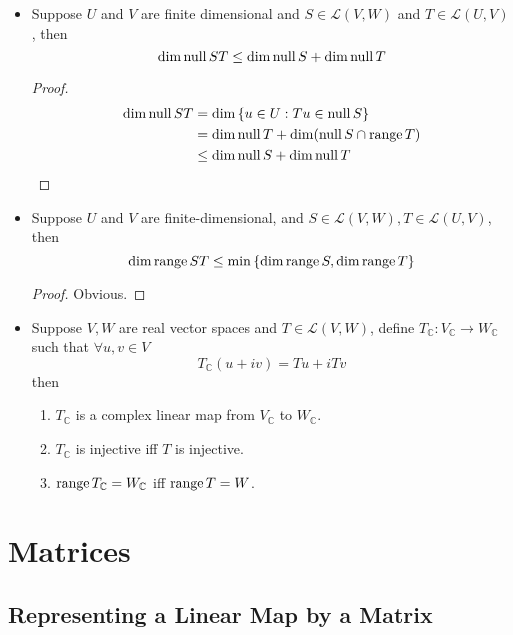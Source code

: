 \documentclass[../main.tex]{subfiles}
\begin{document}
\begin{itemize}
\item Suppose $U$ and $V$ are finite dimensional and $S\in \mathscr{L}(V,W)$ and $T\in \mathscr{L}(U,V)$, then 
	\begin{equation}
	\dim \operatorname{null} ST \leq \dim\operatorname{null} S + \dim \operatorname{null} T
	\end{equation}
	\begin{proof}
	\begin{equation*}
	\begin{aligned}
		\dim \operatorname{null} ST &= \dim \left\{ u \in U: Tu \in \operatorname{null} S \right\} \\
			       &= \dim \operatorname{null} T + \dim (\operatorname{null} S \cap \operatorname{range} T)\\
			       &\leq \dim\operatorname{null} S + \dim\operatorname{null} T
	\end{aligned}
	\end{equation*}
	\end{proof}
\item Suppose $U$ and $V$ are finite-dimensional, and $S\in \mathscr{L}(V,W), T\in \mathscr{L}(U,V)$, then
	\begin{equation}
	\dim\operatorname{range} ST \leq \min \left\{ \dim\operatorname{range} S, \dim\operatorname{range} T \right\}
	\end{equation}
	\begin{proof}
	Obvious.
	\end{proof}
\item Suppose $V,W$ are real vector spaces and $T\in \mathscr{L}(V,W)$, define $T_{\mathbb{C}}: V_{\mathbb{C}} \rightarrow  W_{\mathbb{C}}$ such that $\forall u,v\in V$
	\begin{equation}
	T_{\mathbb{C}}(u+iv) = Tu+iTv
	\end{equation}
	then
	\begin{enumerate}
		\item $T_{\mathbb{C}}$ is a complex linear map from $V_{\mathbb{C}}$ to $W_{\mathbb{C}}$.
		\item $T_{\mathbb{C}}$ is injective iff $T$ is injective.
		\item $\operatorname{range} T_{\mathbb{C}} = W_{\mathbb{C}}$ iff $\operatorname{range} T = W$.
	\end{enumerate}
\end{itemize}



\section{Matrices}
\subsection{Representing a Linear Map by a Matrix}
\end{document}
